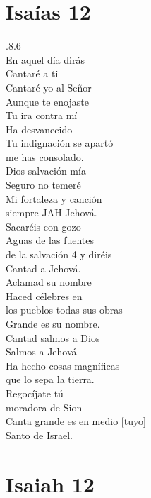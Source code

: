 \documentclass{article}
\begin{document}
\begin{multicols}{2}

\section*{Isa\'ias 12}  
.8.6\\ 

 En aquel d\'ia dir\'as\\
Cantar\'e a ti\\
Cantar\'e yo al Se\~nor\\
Aunque te enojaste\\

\noindent Tu ira contra m\'i\\
Ha desvanecido\\
Tu indignaci\'on se apart\'o\\
me has consolado.\\

 Dios salvaci\'on m\'ia\\
Seguro no temer\'e\\
Mi fortaleza y canci\'on\\
siempre JAH Jehov\'a.\\

 Sacar\'eis con gozo\\
Aguas de las fuentes\\
de la salvaci\'on 4 y dir\'eis\\
Cantad a Jehov\'a.\\

\noindent Aclamad su nombre\\
Haced c\'elebres en\\
los pueblos todas sus obras\\
Grande es su nombre.\\

  Cantad salmos a Dios\\
Salmos a Jehov\'a\\
Ha hecho cosas magn\'ificas\\
que lo sepa la tierra.\\

 Regoc\'ijate t\'u\\
moradora de Sion\\
Canta grande es en medio [tuyo]\\
Santo de Israel.

\newcolumn

\section*{Isaiah 12}


\end{multicols}
\end{document}

